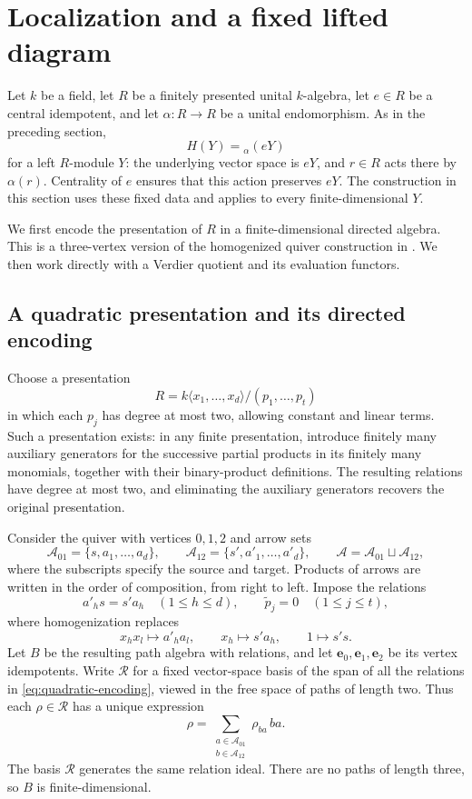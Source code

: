 \section{Localization and a fixed lifted diagram}
\label{sec:localization}

Let $k$ be a field, let $R$ be a finitely presented unital $k$-algebra,
let $e\in R$ be a central idempotent, and let
$\alpha:R\to R$ be a unital endomorphism.  As in the preceding section,
\[
  H(Y)={}_{\alpha}(eY)
\]
for a left $R$-module $Y$: the underlying vector space is $eY$, and
$r\in R$ acts there by $\alpha(r)$.  Centrality of $e$ ensures that this
action preserves $eY$.  The construction in this section uses these
fixed data and applies to every finite-dimensional $Y$.

We first encode the presentation of $R$ in a finite-dimensional directed
algebra.  This is a three-vertex version of the homogenized quiver
construction in \cite[Section~1, Theorem~1.1 and Proposition~1.2]{NRS2004}.
We then work directly with a Verdier
quotient and its evaluation functors.

\subsection{A quadratic presentation and its directed encoding}

Choose a presentation
\[
  R=k\langle x_1,\ldots,x_d\rangle/(p_1,\ldots,p_t)
\]
in which each $p_j$ has degree at most two, allowing constant and linear
terms.  Such a presentation exists: in any finite presentation, introduce
finitely many auxiliary generators for the successive partial products
in its finitely many monomials, together with their binary-product
definitions.  The resulting relations have degree at most two, and
eliminating the auxiliary generators recovers the original presentation.

Consider the quiver with vertices $0,1,2$ and arrow sets
\[
  \mathcal A_{01}=\{s,a_1,\ldots,a_d\},\qquad
  \mathcal A_{12}=\{s',a'_1,\ldots,a'_d\},\qquad
  \mathcal A=\mathcal A_{01}\sqcup\mathcal A_{12},
\]
where the subscripts specify the source and target.  Products of arrows
are written in the order of composition, from right to left.  Impose
the relations
\begin{equation}\label{eq:quadratic-encoding}
  a'_h s=s'a_h\quad(1\le h\le d),
  \qquad \widetilde p_j=0\quad(1\le j\le t),
\end{equation}
where homogenization replaces
\[
  x_hx_l\longmapsto a'_h a_l,\qquad
  x_h\longmapsto s'a_h,\qquad
  1\longmapsto s's.
\]
Let $B$ be the resulting path algebra with relations, and let
$\mathbf e_0,\mathbf e_1,\mathbf e_2$ be its vertex idempotents.
Write $\mathcal R$ for a fixed vector-space basis of the span of all
the relations in \eqref{eq:quadratic-encoding}, viewed in the free
space of paths of length two.  Thus each $\rho\in\mathcal R$ has a
unique expression
\[
  \rho=\sum_{\substack{a\in\mathcal A_{01}\\b\in\mathcal A_{12}}}
             \rho_{ba}\,ba.
\]
The basis $\mathcal R$ generates the same relation ideal.  There are
no paths of length three, so $B$ is finite-dimensional.

